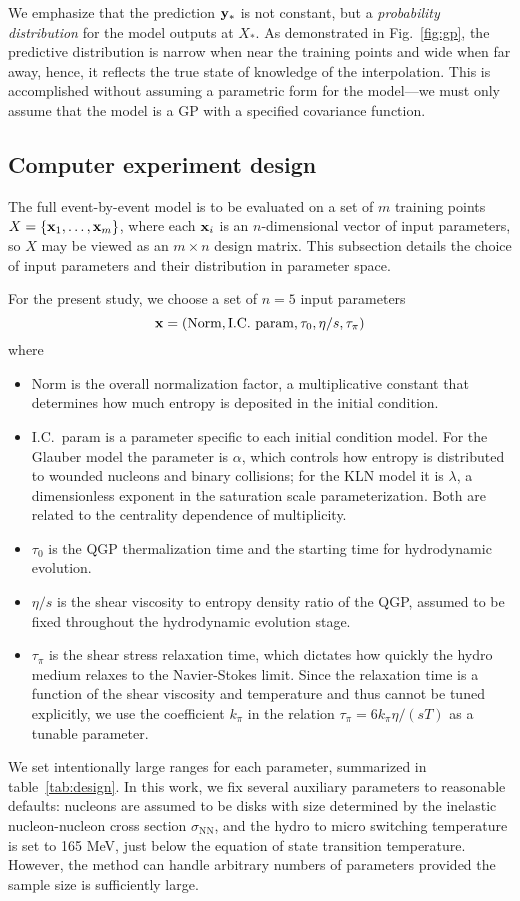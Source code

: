 \documentclass[aps,prc,reprint,superscriptaddress,amsmath]{revtex4-1}
\begin{document}
We emphasize that the prediction $\mathbf y_*$ is not constant, but a \emph{probability distribution} for the model outputs at $X_*$.
As demonstrated in Fig.~\ref{fig:gp}, the predictive distribution is narrow when near the training points and wide when far away, hence, it reflects the true state of knowledge of the interpolation.
This is accomplished without assuming a parametric form for the model---we must only assume that the model is a GP with a specified covariance function.


\subsection{Computer experiment design}

The full event-by-event model is to be evaluated on a set of $m$ training points $X = \{\mathbf x_1, \ldots, \mathbf x_m\}$, where each $\mathbf x_i$ is an $n$-dimensional vector of input parameters, so $X$ may be viewed as an $m \times n$ design matrix.
This subsection details the choice of input parameters and their distribution in parameter space.

For the present study, we choose a set of $n = 5$ input parameters
\begin{equation}
  \mathbf x = (\text{Norm}, \text{I.C.\ param}, \tau_0, \eta/s, \tau_\pi)
\end{equation}
where
\begin{itemize}
  \item Norm is the overall normalization factor, a multiplicative constant that determines how much entropy is deposited in the initial condition.
  \item I.C.\ param is a parameter specific to each initial condition model.
    For the Glauber model the parameter is $\alpha$, which controls how entropy is distributed to wounded nucleons and binary collisions;
    for the KLN model it is $\lambda$, a dimensionless exponent in the saturation scale parameterization.
    Both are related to the centrality dependence of multiplicity.
  \item $\tau_0$ is the QGP thermalization time and the starting time for hydrodynamic evolution.
  \item $\eta/s$ is the shear viscosity to entropy density ratio of the QGP, assumed to be fixed throughout the hydrodynamic evolution stage.
  \item $\tau_\pi$ is the shear stress relaxation time, which dictates how quickly the hydro medium relaxes to the Navier-Stokes limit.
    Since the relaxation time is a function of the shear viscosity and temperature and thus cannot be tuned explicitly, we use the coefficient $k_\pi$ in the relation $\tau_\pi = 6k_\pi\eta/(sT)$ as a tunable parameter.
\end{itemize}
We set intentionally large ranges for each parameter, summarized in table~\ref{tab:design}.
In this work, we fix several auxiliary parameters to reasonable defaults:
nucleons are assumed to be disks with size determined by the inelastic nucleon-nucleon cross section $\sigma_\text{NN}$, and the hydro to micro switching temperature is set to 165 MeV, just below the equation of state transition temperature.
However, the method can handle arbitrary numbers of parameters provided the sample size is sufficiently large.
\end{document}
